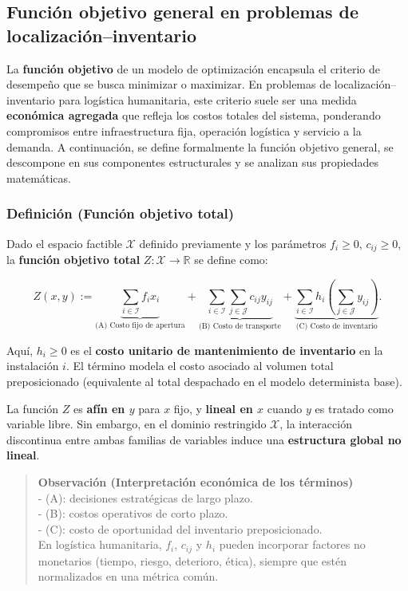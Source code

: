 \documentclass[
  spanish,
  us-letterpaper,
  DIV=11,
  numbers=noendperiod]{scrreprt}
\numberwithin{equation}{section}
\begin{document}
\subsection{Función objetivo general en problemas de
localización--inventario}\label{funciuxf3n-objetivo-general-en-problemas-de-localizaciuxf3ninventario}

La \textbf{función objetivo} de un modelo de optimización encapsula el
criterio de desempeño que se busca minimizar o maximizar. En problemas
de localización--inventario para logística humanitaria, este criterio
suele ser una medida \textbf{económica agregada} que refleja los costos
totales del sistema, ponderando compromisos entre infraestructura fija,
operación logística y servicio a la demanda. A continuación, se define
formalmente la función objetivo general, se descompone en sus
componentes estructurales y se analizan sus propiedades matemáticas.

\subsubsection{\texorpdfstring{\textbf{Definición (Función objetivo
total)}}{Definición (Función objetivo total)}}\label{definiciuxf3n-funciuxf3n-objetivo-total}

Dado el espacio factible \(\mathcal{X}\) definido previamente y los
parámetros \(f_i \ge 0\), \(c_{ij} \ge 0\), la \textbf{función objetivo
total} \(Z: \mathcal{X} \to \mathbb{R}\) se define como:

\[
Z(x, y) :=
\underbrace{\sum_{i \in \mathcal{I}} f_i x_i}_{\text{(A) Costo fijo de apertura}}
+
\underbrace{\sum_{i \in \mathcal{I}} \sum_{j \in \mathcal{J}} c_{ij} y_{ij}}_{\text{(B) Costo de transporte}}
+
\underbrace{\sum_{i \in \mathcal{I}} h_i \left( \sum_{j \in \mathcal{J}} y_{ij} \right)}_{\text{(C) Costo de inventario}}.
\]

Aquí, \(h_i \ge 0\) es el \textbf{costo unitario de mantenimiento de
inventario} en la instalación \(i\). El término modela el costo asociado
al volumen total preposicionado (equivalente al total despachado en el
modelo determinista base).

La función \(Z\) es \textbf{afín en \(y\)} para \(x\) fijo, y
\textbf{lineal en \(x\)} cuando \(y\) es tratado como variable libre.
Sin embargo, en el dominio restringido \(\mathcal{X}\), la interacción
discontinua entre ambas familias de variables induce una
\textbf{estructura global no lineal}.

\begin{quote}
\textbf{Observación (Interpretación económica de los términos)}\\
- (A): decisiones estratégicas de largo plazo.\\
- (B): costos operativos de corto plazo.\\
- (C): costo de oportunidad del inventario preposicionado.\\
En logística humanitaria, \(f_i\), \(c_{ij}\) y \(h_i\) pueden
incorporar factores no monetarios (tiempo, riesgo, deterioro, ética),
siempre que estén normalizados en una métrica común.
\end{quote}
\end{document}
